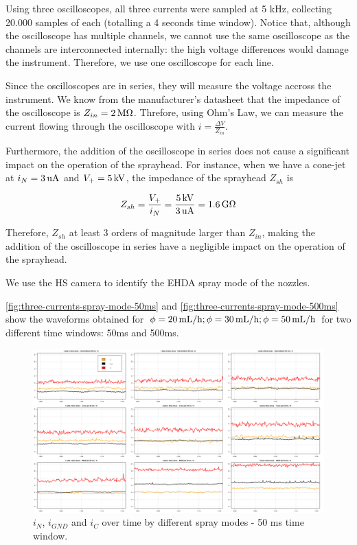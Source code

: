 \documentclass[oneside,12pt]{article}
\begin{document}
Using three oscilloscopes, all three currents were sampled at 5 kHz, collecting 20.000 samples of each
(totalling a 4 seconds time window). Notice that, although the oscilloscope has multiple channels, 
we cannot use the same oscilloscope as the channels are interconnected internally: the high voltage 
differences would damage the instrument. Therefore, we use one oscilloscope for each line. 

Since the oscilloscopes are in series, they will measure the voltage accross the instrument. We know from the manufacturer's 
datasheet that the impedance of the oscilloscope is $Z_{in} = 2 \,\mathrm{M} \Omega$. Threfore, using Ohm's Law, we can measure the 
current flowing through the oscilloscope with $i = \frac{\Delta V}{Z_{in}}$. 

Furthermore, the addition of the oscilloscope in series does not cause a significant impact on the operation of the sprayhead.
For instance, when we have a cone-jet at $i_N = 3 \,\mathrm{uA}$ and $V_+ = 5 \,\mathrm{kV}$, the impedance of the sprayhead $Z_{sh}$ is

\[  Z_{sh} = \frac{V_+}{i_N} = \frac{5 \,\mathrm{kV}}{3 \,\mathrm{uA}} = 1.6 \,\mathrm{G} \Omega \]

Therefore, $Z_{sh}$ at least 3 orders of magnitude larger than $Z_{in}$, making the addition of the oscilloscope in series
have a negligible impact on the operation of the sprayhead.

We use the HS camera to identify the EHDA spray mode of the nozzles.
 
\autoref{fig:three-currents-spray-mode-50ms} and \autoref{fig:three-currents-spray-mode-500ms} show the waveforms 
obtained for $\phi = 20 \,\mathrm{mL/h}; \phi = 30 \,\mathrm{mL/h}; \phi = 50 \,\mathrm{mL/h}$ for two different time windows: 50ms 
and 500ms.

\begin{figure}[h!]
    \centering
    \includegraphics[width=1\textwidth,trim=1 1 1 1,clip]{figures/three-currents-spray-mode-50ms.png}
    \caption{$i_N$, $i_{GND}$ and $i_C$ over time by different spray modes - 50 ms time window.}
    \label{fig:three-currents-spray-mode-50ms}
\end{figure}
\end{document}
